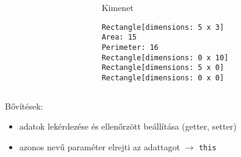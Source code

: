 \documentclass[usenames,dvipsnames,aspectratio=169]{beamer}
\begin{document}
\begin{frame}
    \begin{exampleblock}{}
        \scriptsize
        
    \end{exampleblock}
    \begin{exampleblock}{}
        \scriptsize
        
    \end{exampleblock}
\end{frame}

\begin{frame}[fragile]
    \begin{columns}
        \begin{column}{0.7\textwidth}
            \begin{exampleblock}{}
                \scriptsize
                
            \end{exampleblock}
        \end{column}
        \begin{column}{0.3\textwidth}
            \begin{block}{Kimenet}
                \vspace{-0.4cm}
                \scriptsize
                \begin{verbatim}
Rectangle[dimensions: 5 x 3]
Area: 15
Perimeter: 16
Rectangle[dimensions: 0 x 10]
Rectangle[dimensions: 5 x 0]
Rectangle[dimensions: 0 x 0]
\end{verbatim}
                \vspace{-0.4cm}
            \end{block}
        \end{column}
    \end{columns}
\end{frame}

\begin{frame}
    Bővítések:
    \begin{itemize}
        \item adatok lekérdezése és ellenőrzött beállítása (getter, setter)
        \item azonos nevű paraméter elrejti az adattagot $\to$ \texttt{this}
    \end{itemize}
    \begin{exampleblock}{}
        \scriptsize
        \vspace{-0.3cm}
        
        
        \vspace{-0.3cm}
    \end{exampleblock}
\end{frame}
\end{document}
